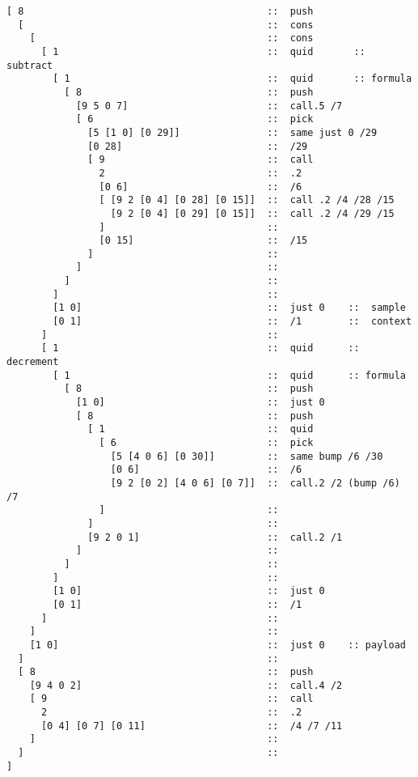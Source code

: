 \begin{framed_shaded}
\begin{Verbatim}[fontsize=\relsize{-2.5},commandchars=\\\{\}]
[ 8                                          ::  push
  [                                          ::  cons
    [                                        ::  cons
      [ 1                                    ::  quid       :: subtract
        [ 1                                  ::  quid       :: formula
          [ 8                                ::  push
            [9 5 0 7]                        ::  call.5 /7
            [ 6                              ::  pick
              [5 [1 0] [0 29]]               ::  same just 0 /29
              [0 28]                         ::  /29
              [ 9                            ::  call
                2                            ::  .2
                [0 6]                        ::  /6
                [ [9 2 [0 4] [0 28] [0 15]]  ::  call .2 /4 /28 /15
                  [9 2 [0 4] [0 29] [0 15]]  ::  call .2 /4 /29 /15
                ]                            ::
                [0 15]                       ::  /15
              ]                              ::
            ]                                ::
          ]                                  ::
        ]                                    ::
        [1 0]                                ::  just 0    ::  sample
        [0 1]                                ::  /1        ::  context
      ]                                      :: 
      [ 1                                    ::  quid      :: decrement
        [ 1                                  ::  quid      :: formula
          [ 8                                ::  push
            [1 0]                            ::  just 0
            [ 8                              ::  push
              [ 1                            ::  quid
                [ 6                          ::  pick
                  [5 [4 0 6] [0 30]]         ::  same bump /6 /30
                  [0 6]                      ::  /6
                  [9 2 [0 2] [4 0 6] [0 7]]  ::  call.2 /2 (bump /6) /7
                ]                            ::
              ]                              ::
              [9 2 0 1]                      ::  call.2 /1
            ]                                ::
          ]                                  ::
        ]                                    ::
        [1 0]                                ::  just 0
        [0 1]                                ::  /1
      ]                                      ::
    ]                                        ::
    [1 0]                                    ::  just 0    :: payload
  ]                                          :: 
  [ 8                                        ::  push
    [9 4 0 2]                                ::  call.4 /2
    [ 9                                      ::  call
      2                                      ::  .2
      [0 4] [0 7] [0 11]                     ::  /4 /7 /11
    ]                                        ::
  ]                                          ::
]
\end{Verbatim}
\end{framed_shaded}
